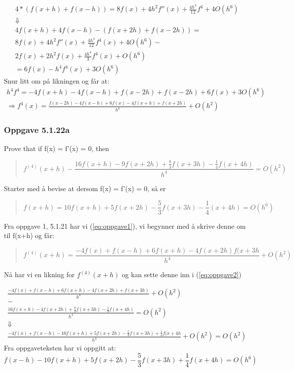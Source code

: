 \begin{multline*}
4 * (f(x+h) + f(x-h)) = 8f(x) + 4h^2 f''(x) + \frac{4h^4}{12} f^4 + 4O(h^6) \\
\Downarrow
\\
4f(x+h) + 4f(x-h) - (f(x+2h) + f(x-2h)) = \\ 
8f(x) + 4h^2 f''(x) + \frac{4h^4}{12} f^4 (x) + 4O(h^6) - \\
2f(x) + 2h^2 f(x) + \frac{4h^4}{3} f^4 (x) + O (h^6) \\
= 6f(x) - h^4 f^4 (x) + 3O (h^6)
\end{multline*}
Snur litt om på likningen og får at:
\begin{multline}
h^4 f^4 = -4f(x+h) - 4f(x-h) + f(x-2h) + f(x-2h) + 6f(x) + 3O(h^6)\\
\Rightarrow f^4 (x) = \frac{f(x-2h) - 4f(x-h) + 6f(x) - 4f(x+h) + f(x+2h)}{h^4} + O(h^2)
\end{multline}


\subsubsection{Oppgave 5.1.22a}
Prove that if f(x) = f'(x) = 0, then
\begin{quote}
\begin{equation}\label{eq:oppgave2}
f^{(4)} (x + h) - \frac{16f(x + h) - 9f(x + 2h) + \frac{8}{3}f(x + 3h) - \frac{1}{4}f(x + 4h)}{h^4} = O(h^2)
\end{equation}
\end{quote}
Starter med å bevise at dersom f(x) = f'(x) = 0, så er
\begin{quote}
\begin{equation}
f(x + h) = 10f(x+h) + 5f(x + 2h) - \frac{5}{3}f(x + 3h) - \frac{1}{4}(x+4h) = O(h^6)
\end{equation}
\end{quote}
Fra oppgave 1, 5.1.21 har vi (\ref{eq:oppgave1}), vi begynner med å skrive denne om til f(x+h) og får:
\begin{quote}
\begin{equation}\label{eq:f^4(x+h)}
f^{(4)}(x+h) = \frac{-4f(x) + f(x-h) + 6f(x+h) - 4f(x+2h) f(x+3h}{h^4} + O(h^2)
\end{equation}
\end{quote}

Nå har vi en likning for $ f^{(4)} (x+h)$ og kan sette denne inn i (\ref{eq:oppgave2})


\begin{multline*}
\frac{-4f(x) + f(x-h) + 6f(x+h) - 4f(x+2h) + f(x+3h)}{h^4} + O(h^2)\\
-
\\
\frac{16f(x+h) - 4f(x+2h) + \frac{8}{3}f(x+3h) - \frac{1}{4}f(x+4h)}{h^4}  = O(h^2)
\\
\Downarrow
\\
\frac{-4f(x)+f(x-h)-10f(x+h)+5f(x+2h)-\frac{5}{3}f(x+3h)+\frac{1}{4}f(x+4h}{h^4} + O(h^2) = O(h^2)
\end{multline*}
Fra oppgaveteksten har vi oppgitt at:
\begin{equation*}
f(x-h)-10f(x+h)+5f(x+2h)-\frac{5}{3}f(x+3h)+\frac{1}{4}f(x+4h) = O(h^6)
\end{equation*}

